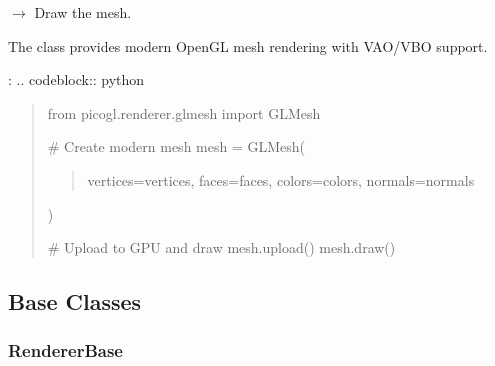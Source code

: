\documentclass[a4paper,10pt,english,openany,oneside]{sphinxmanual}
\begin{document}
\begin{fulllineitems}
\begin{fulllineitems}
\end{fulllineitems}


\begin{fulllineitems}
\label{\detokenize{api/renderer:picogl.renderer.glmesh.GLMesh.draw}}
\pysigstartsignatures
\pysiglinewithargsret
{}
{}
{{ $\rightarrow$ }}
\pysigstopsignatures
\sphinxAtStartPar
Draw the mesh.

\end{fulllineitems}


\end{fulllineitems}


\sphinxAtStartPar
The  class provides modern OpenGL mesh rendering with VAO/VBO support.

\sphinxAtStartPar
{}:
.. code\sphinxhyphen{}block:: python
\begin{quote}

\sphinxAtStartPar
from picogl.renderer.glmesh import GLMesh

\sphinxAtStartPar
\# Create modern mesh
mesh = GLMesh(
\begin{quote}

\sphinxAtStartPar
vertices=vertices,
faces=faces,
colors=colors,
normals=normals
\end{quote}

\sphinxAtStartPar
)

\sphinxAtStartPar
\# Upload to GPU and draw
mesh.upload()
mesh.draw()
\end{quote}


\subsection{Base Classes}
\label{\detokenize{api/renderer:base-classes}}

\subsubsection{RendererBase}
\label{\detokenize{api/renderer:rendererbase}}
\end{document}

